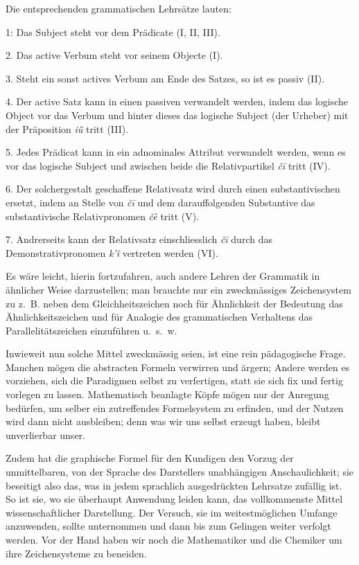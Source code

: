 \largerpage
Die entsprechenden grammatischen Lehrsätze lauten:

1: Das Subject steht vor dem Prädicate (I, II, III).

\label{fp.125}

2. Das active Verbum steht vor seinem Objecte (I).

3. Steht ein sonst actives Verbum am Ende des Satzes, so ist es passiv (II).

4. Der active Satz kann in einen passiven verwandelt werden, indem das logische Object vor das Verbum und hinter dieses das logische Subject (der Urheber) mit der Präposition \textit{iǖ} tritt (III).

5. Jedes Prädicat kann in ein adnominales Attribut verwandelt werden, wenn es vor das logische Subject und zwischen beide die Relativpartikel \textit{čī} tritt (IV).

6. Der solchergestalt geschaffene Relativsatz wird durch einen substantivischen ersetzt, indem an Stelle von \textit{čī} und dem darauffolgenden Substantive das substantivische Relativpronomen \textit{čè} tritt (V).

7. Andrerseits kann der Relativsatz einschliesslich \textit{čī} durch das Demonstrativpronomen \textit{k’î} vertreten werden (VI).

\largerpage
Es wäre leicht, hierin fortzufahren, auch andere Lehren der Grammatik in ähnlicher Weise darzustellen; man brauchte nur ein zweckmässiges Zeichensystem zu  z.~B. neben dem Gleichheitszeichen noch für Ähnlichkeit der Bedeutung das Ähnlichkeitszeichen und für Analogie des grammatischen Verhaltens das Parallelitätszeichen einzuführen u.~s.~w. 

Inwieweit nun solche Mittel zweckmässig seien, ist eine rein pädagogische \label{sp.119} Frage. Manchen mögen die abstracten Formeln verwirren und ärgern; Andere werden es vorziehen, sich die Paradigmen selbst zu verfertigen, statt sie sich fix und fertig vorlegen zu lassen. Mathematisch beanlagte Köpfe mögen nur der Anregung bedürfen, um selber ein zutreffendes Formelsystem zu erfinden, und der Nutzen wird dann nicht ausbleiben; denn was wir uns selbst erzeugt haben, bleibt unverlierbar unser.

Zudem hat die graphische Formel für den Kundigen den Vorzug der unmittelbaren, von der Sprache des Darstellers unabhängigen Anschaulichkeit; sie beseitigt also das, was in jedem sprachlich ausgedrückten Lehrsatze zufällig ist. So ist sie, wo sie überhaupt Anwendung leiden kann, das vollkommenste Mittel wissenschaftlicher Darstellung. Der Versuch, sie im weitestmöglichen Umfange anzuwenden, sollte unternommen und dann bis zum Gelingen weiter verfolgt werden. Vor der Hand haben wir noch die Mathematiker und die Chemiker um ihre Zeichensysteme zu beneiden.

